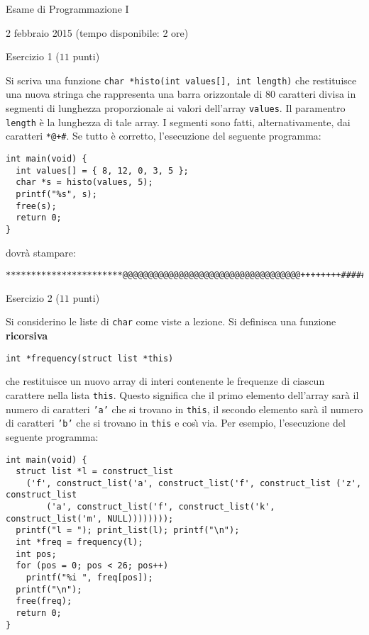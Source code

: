 \documentclass[12pt]{article}
\begin{document}
\begin{center}{\LARGE Esame di Programmazione I}\\
\vspace*{-2ex}
\begin{center}
  \large 2 febbraio 2015 (tempo disponibile: 2 ore)
\end{center}
\end{center}
\begin{center}{\Large Esercizio 1} ($11$ punti)
\end{center}
Si scriva una funzione \texttt{char *histo(int values[], int length)}
che restituisce una nuova stringa che rappresenta una barra orizzontale di 80 caratteri
divisa in segmenti di lunghezza proporzionale ai valori dell'array \texttt{values}.
Il paramentro \texttt{length} \`e la lunghezza di tale array. I segmenti sono fatti,
alternativamente, dai caratteri \texttt{*@+\#}.
Se tutto \`e corretto, l'esecuzione del seguente programma:

{\small
\begin{verbatim}
int main(void) {
  int values[] = { 8, 12, 0, 3, 5 };
  char *s = histo(values, 5);
  printf("%s", s);
  free(s);
  return 0;
}
\end{verbatim}}

\noindent
dovr\`a stampare:
%
{\small
\begin{verbatim}
***********************@@@@@@@@@@@@@@@@@@@@@@@@@@@@@@@@@@@++++++++##############
\end{verbatim}}

\vspace*{1ex}
\begin{center}{\Large Esercizio 2} ($11$ punti)\end{center}
%
Si considerino le liste di \texttt{char} come viste a lezione. Si definisca una funzione
\textbf{ricorsiva}
%
\begin{verbatim}
int *frequency(struct list *this)
\end{verbatim}
%
che restituisce un nuovo array di interi contenente
le frequenze di ciascun carattere nella lista
\texttt{this}. Questo significa che il primo elemento dell'array sar\`a il numero di
caratteri \texttt{'a'} che si trovano in \texttt{this}, il secondo elemento sar\`a il
numero di caratteri \texttt{'b'} che si trovano in \texttt{this} e cos\`{\i} via. Per
esempio, l'esecuzione del seguente programma:

{\small
\begin{verbatim}
int main(void) {
  struct list *l = construct_list
    ('f', construct_list('a', construct_list('f', construct_list ('z', construct_list
        ('a', construct_list('f', construct_list('k', construct_list('m', NULL))))))));
  printf("l = "); print_list(l); printf("\n");
  int *freq = frequency(l);
  int pos;
  for (pos = 0; pos < 26; pos++)
    printf("%i ", freq[pos]);
  printf("\n");
  free(freq);
  return 0;
}
\end{verbatim}}
\end{document}
